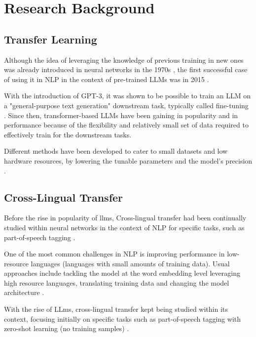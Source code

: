 \section{Research Background}\label{section::research_background}

\subsection{Transfer Learning}

Although the idea of leveraging the knowledge of previous training in new ones was already introduced in neural networks in the 1970s \cite{bozinovski2020reminder}, the first successful case of using it in NLP in the context of pre-trained LLMs was in 2015 \cite{HAN2021225}.

With the introduction of GPT-3, it was shown to be possible to train an LLM on a "general-purpose text generation" downstream task, typically called fine-tuning \cite{WANG202351}. Since then, transformer-based LLMs have been gaining in popularity and in performance because of the flexibility and relatively small set of data required to effectively train for the downstream tasks.

Different methods have been developed to cater to small datasets and low hardware resources, by lowering the tunable parameters and the model's precision \cite{parthasarathy2024ultimate}.
\subsection{Cross-Lingual Transfer}


Before the rise in popularity of llms, Cross-lingual transfer had been continually studied within neural networks in the context of NLP for specific tasks, such as part-of-speech tagging \cite{kim-etal-2017-cross}.

One of the most common challenges in NLP is improving performance in low-resource languages (languages with small amounts of training data). Usual approaches include tackling the model at the word embedding level leveraging high resource languages, translating training data \cite{schuster2018cross} and changing the model architecture \cite{pfeiffer2020mad}.

With the rise of LLms, cross-lingual transfer kept being studied within its context, focusing initially on specific tasks such as part-of-speech tagging with zero-shot learning (no training samples) \cite{adelani2024comparing}.

